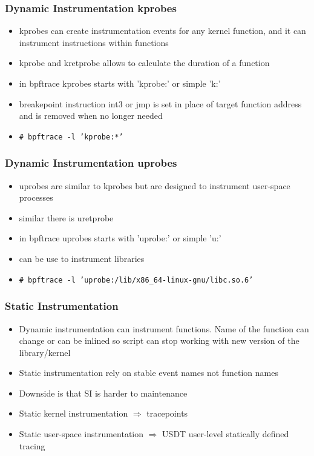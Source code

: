 \documentclass{beamer}
\begin{document}
\begin{frame}
  \frametitle{Dynamic Instrumentation kprobes}
  \begin{itemize}
    \item<1-> kprobes can create instrumentation events for any kernel function, and it can instrument instructions within functions
		\item<2-> kprobe and kretprobe allows to calculate the duration of a function 
		\item<3-> in bpftrace kprobes starts with 'kprobe:' or simple 'k:'
    \item<4-> breakepoint instruction int3 or jmp is set in place of target function address and is removed when no longer needed
    \item<5-> {\scriptsize \texttt{\# bpftrace -l 'kprobe:*'}}
	\end{itemize}	
\end{frame}

\begin{frame}
  \frametitle{Dynamic Instrumentation uprobes}
  \begin{itemize}
    \item<1-> uprobes are similar to kprobes but are designed to instrument user-space processes
		\item<2-> similar there is uretprobe
		\item<3-> in bpftrace uprobes starts with 'uprobe:' or simple 'u:'
		\item<4-> can be use to instrument libraries
    \item<5-> {\scriptsize \texttt{\# bpftrace -l 'uprobe:/lib/x86\_64-linux-gnu/libc.so.6' }}
	\end{itemize}	
\end{frame}

\begin{frame}
  \frametitle{Static Instrumentation}
	\begin{itemize}
	  \item<1-> Dynamic instrumentation can instrument functions. Name of the function can change or can be inlined so script can stop working with new version of the library/kernel
		\item<2-> Static instrumentation rely on stable event names not function names
		\item<3-> Downside is that SI is harder to maintenance
		\item<4-> Static kernel instrumentation $\Rightarrow$ tracepoints
		\item<5-> Static user-space instrumentation $\Rightarrow$ USDT user-level statically defined tracing
	\end{itemize}
\end{frame}
\end{document}
